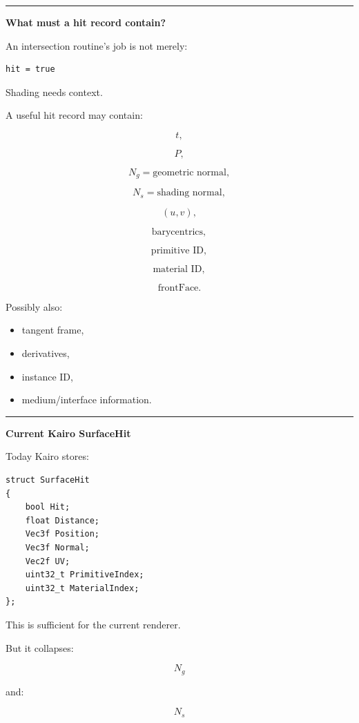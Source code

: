 \begin{center}\rule{0.5\linewidth}{0.5pt}\end{center}

\textbf{What must a hit record contain?}

An intersection routine's job is not merely:

\begin{verbatim}
hit = true
\end{verbatim}

Shading needs context.

A useful hit record may contain:

\[
t,
\]

\[
P,
\]

\[
N_g=\text{geometric normal},
\]

\[
N_s=\text{shading normal},
\]

\[
(u,v),
\]

\[
\text{barycentrics},
\]

\[
\text{primitive ID},
\]

\[
\text{material ID},
\]

\[
\text{frontFace}.
\]

Possibly also:

\begin{itemize}
\tightlist
\item
  tangent frame,
\item
  derivatives,
\item
  instance ID,
\item
  medium/interface information.
\end{itemize}

\begin{center}\rule{0.5\linewidth}{0.5pt}\end{center}

\textbf{Current Kairo SurfaceHit}

Today Kairo stores:

\begin{verbatim}
struct SurfaceHit
{
    bool Hit;
    float Distance;
    Vec3f Position;
    Vec3f Normal;
    Vec2f UV;
    uint32_t PrimitiveIndex;
    uint32_t MaterialIndex;
};
\end{verbatim}

This is sufficient for the current renderer.

But it collapses:

\[
N_g
\]

and:

\[
N_s
\]

